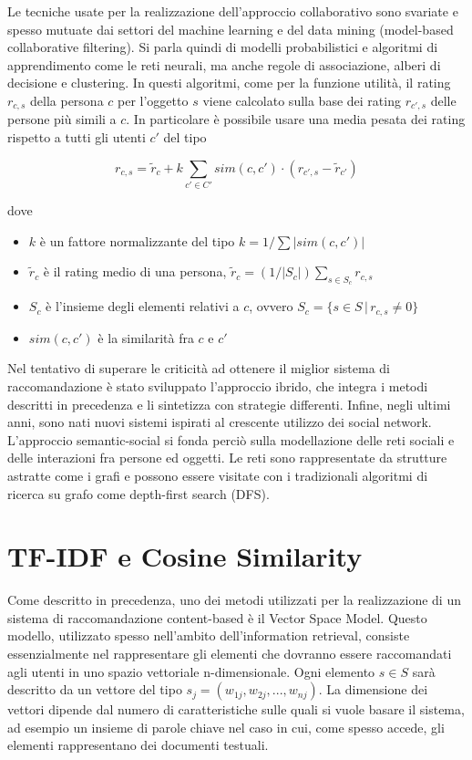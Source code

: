 \documentclass[Lau,binding=0.6cm,noexaminfo,oneside]{sapthesis}
\begin{document}
Le tecniche usate per la realizzazione dell'approccio collaborativo sono svariate e spesso mutuate dai settori del machine learning e del data mining (model-based collaborative filtering). Si parla quindi di modelli probabilistici e algoritmi di apprendimento come le reti neurali, ma anche regole di associazione, alberi di decisione e clustering.
In questi algoritmi, come per la funzione utilità, il rating $r_{c,s}$ della persona $c$ per l'oggetto $s$ viene calcolato sulla base dei rating $r_{c',s}$ delle persone più simili a $c$. In particolare è possibile usare una media pesata dei rating rispetto a tutti gli utenti $c'$ del tipo

\[
r_{c,s} = \widetilde{r}_c + k \sum_{c' \in C'} sim(c,c') \cdot (r_{c',s} - \widetilde{r}_{c'})
\]

dove

\begin{itemize}
  \item $k$ è un fattore normalizzante del tipo $k = 1 / \sum |sim(c,c')|$
  \item $\widetilde{r}_c$ è il rating medio di una persona, $\widetilde{r}_c = (1/|S_c|) \sum_{s \in S_c} r_{c,s}$
  \item $S_c$ è l'insieme degli elementi relativi a $c$, ovvero $S_c = \{s \in S \, | \, r_{c,s} \neq 0\}$
  \item $sim(c,c')$ è la similarità fra $c$ e $c'$
\end{itemize}

\medskip

Nel tentativo di superare le criticità ad ottenere il miglior sistema di raccomandazione è stato sviluppato l'approccio ibrido, che integra i metodi descritti in precedenza e li sintetizza con strategie differenti. Infine, negli ultimi anni, sono nati nuovi sistemi ispirati al crescente utilizzo dei social network.
L'approccio semantic-social si fonda perciò sulla modellazione delle reti sociali e delle interazioni fra persone ed oggetti. Le reti sono rappresentate da strutture astratte come i grafi e possono essere visitate con i tradizionali algoritmi di ricerca su grafo come depth-first search (DFS).\medskip

\section{TF-IDF e Cosine Similarity}

Come descritto in precedenza, uno dei metodi utilizzati per la realizzazione di un sistema di raccomandazione content-based è il Vector Space Model. Questo modello,  utilizzato spesso nell'ambito dell'information retrieval, consiste essenzialmente nel rappresentare gli elementi che dovranno essere raccomandati agli utenti in uno spazio vettoriale n-dimensionale.
Ogni elemento $s \in S$ sarà descritto da un vettore del tipo $s_j = (w_{1j}, w_{2j}, ..., w_{nj})$. La dimensione dei vettori dipende dal numero di caratteristiche sulle quali si vuole basare il sistema, ad esempio un insieme di parole chiave nel caso in cui, come spesso accede, gli elementi rappresentano dei documenti testuali.\medskip
\end{document}
